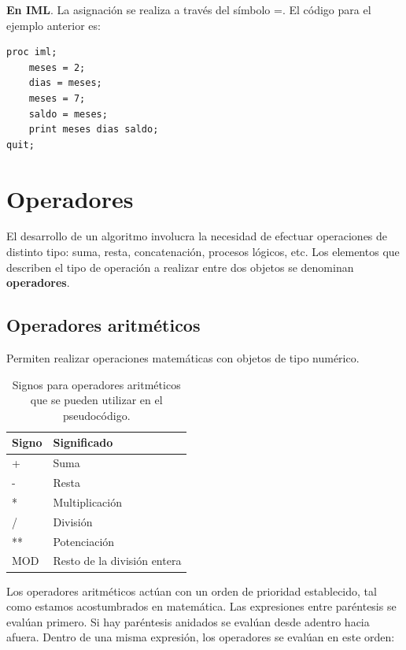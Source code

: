 \documentclass[]{book}
\begin{document}
\textbf{En IML}. La asignación se realiza a través del símbolo =. El código para el ejemplo anterior es:

\begin{verbatim}
proc iml;
    meses = 2;
    dias = meses;
    meses = 7;
    saldo = meses;
    print meses dias saldo;
quit;
\end{verbatim}

\hypertarget{operadores}{%
\section{Operadores}\label{operadores}}

El desarrollo de un algoritmo involucra la necesidad de efectuar operaciones de distinto tipo: suma, resta, concatenación, procesos lógicos, etc. Los elementos que describen el tipo de operación a realizar entre dos objetos se denominan \textbf{operadores}.

\hypertarget{operadores-aritmeticos}{%
\subsection{Operadores aritméticos}\label{operadores-aritmeticos}}

Permiten realizar operaciones matemáticas con objetos de tipo numérico.

\begin{table}[t]

\caption{\label{tab:unnamed-chunk-12}Signos para operadores aritméticos que se pueden utilizar en el pseudocódigo.}
\centering
\begin{tabular}{l|l}
\hline
Signo & Significado\\
\hline
+ & Suma\\
\hline
- & Resta\\
\hline
* & Multiplicación\\
\hline
/ & División\\
\hline
** & Potenciación\\
\hline
MOD & Resto de la división entera\\
\hline
\end{tabular}
\end{table}

Los operadores aritméticos actúan con un orden de prioridad establecido, tal como estamos acostumbrados en matemática. Las expresiones entre paréntesis se evalúan primero. Si hay paréntesis anidados se evalúan desde adentro hacia afuera. Dentro de una misma expresión, los operadores se evalúan en este orden:
\end{document}
